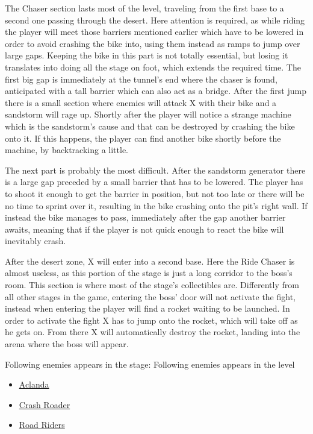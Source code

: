 The Chaser section lasts most of the level, traveling from the first base to a second one passing through the desert. Here attention is required, as while riding the player will meet those barriers mentioned earlier which have to be lowered in order to avoid crashing the bike into, using them instead as ramps to jump over large gaps. Keeping the bike in this part is not totally essential, but losing it translates into doing all the stage on foot, which extends the required time. The first big gap is immediately at the tunnel's end where the chaser is found, anticipated with a tall barrier which can also act as a bridge. After the first jump there is a small section where enemies will attack X with their bike and a sandstorm will rage up. Shortly after the player will notice a strange machine which is the sandstorm's cause and that can be destroyed by crashing the bike onto it. If this happens, the player can find another bike shortly before the machine, by backtracking a little. 

The next part is probably the most difficult. After the sandstorm generator there is a large gap preceded by a small barrier that has to be lowered. The player has to shoot it enough to get the barrier in position, but not too late or there will be no time to sprint over it, resulting in the bike crashing onto the pit's right wall. If instead the bike manages to pass, immediately after the gap another barrier awaits, meaning that if the player is not quick enough to react the bike will inevitably crash.

After the desert zone, X will enter into a second base. Here the Ride Chaser is almost useless, as this portion of the stage is just a long corridor to the boss's room. This section is  where most of the stage's collectibles are. Differently from all other stages in the game, entering the boss' door will not activate the fight, instead when entering the player will find a rocket waiting to be launched. In order to activate the fight X has to jump onto the rocket, which will take off as he gets on. From there X will automatically destroy the rocket, landing into the arena where the boss will appear.

Following enemies appears in the stage:
Following enemies appears in the level~\cite{wiki:Desert_base}
\begin{itemize}
	\item \hyperlink{enem:Aclanda}{Aclanda}
	\item \hyperlink{enem:Crash_Roader}{Crash Roader}
	\item \hyperlink{enem:Road_Riders}{Road Riders}
\end{itemize}

